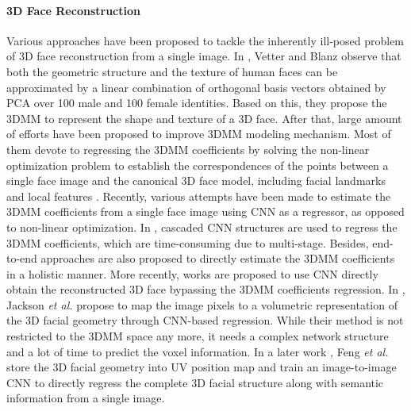 \documentclass[10pt,twocolumn,letterpaper]{article}
\begin{document}
\paragraph{3D Face Reconstruction}Various approaches have been proposed to tackle the inherently ill-posed problem of 3D face reconstruction from a single image. In \cite{blanz1999morphable}, Vetter and Blanz observe that both the geometric structure and the texture of human faces can be approximated by a linear combination of orthogonal basis vectors obtained by PCA over 100 male and 100 female identities. Based on this, they propose the 3DMM to represent the shape and texture of a 3D face. After that, large amount of efforts have been proposed to improve 3DMM modeling mechanism. Most of them devote to regressing the 3DMM coefficients by solving the non-linear optimization problem to establish the correspondences of the points between a single face image and the canonical 3D face model, including facial landmarks \cite{zhu2015high,lee2012single,thies2016face2face,cao2014displaced,jeni2015dense,grewe2016fully} and local features \cite{grewe2016fully,huber2015fitting,romdhani2005estimating}. Recently, various attempts have been made to estimate the 3DMM coefficients from a single face image using CNN as a regressor, as opposed to non-linear optimization. In \cite{jourabloo2016large, zhu2016face, richardson20163d,richardson2017learning}, cascaded CNN structures are used to regress the 3DMM coefficients, which are time-consuming due to multi-stage. Besides, end-to-end approaches \cite{dou2017end, tuan2017regressing, jourabloo2015pose} are also proposed to directly estimate the 3DMM coefficients in a holistic manner. More recently, works are proposed to use CNN directly obtain the reconstructed 3D face bypassing the 3DMM coefficients regression. In \cite{jackson2017large}, Jackson \textit{et al.} propose to map the image pixels to a volumetric representation of the 3D facial geometry through CNN-based regression. While their method is not restricted to the 3DMM space any more, it needs a complex network structure and a lot of time to predict the voxel information. In a later work \cite{feng2018joint}, Feng \textit{et al.} store the 3D facial geometry into UV position map and train an image-to-image CNN to directly regress the complete 3D facial structure along with semantic information from a single image.

\vspace{-0.4cm}
\end{document}
